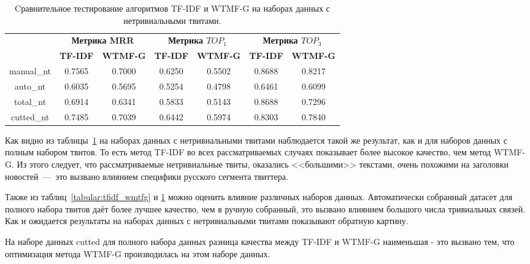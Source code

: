     \begin{table}[ht!]
    \caption{Cравнительное тестирование алгоритмов TF-IDF и WTMF-G на наборах данных с нетривиальными твитами. \bigskip}
    \centering

    \label{tabular:tfidf_wmtfg_nt}
        \begin{tabular}{|c|c|c|c|c|c|c|}
            \hline
            \bf{\multirow{2}{*}{\specialcell{Набор данных}}} &
            \multicolumn{2}{|c|}{\bf{Метрика MRR}} &
            \multicolumn{2}{|c|}{\bf{Метрика $TOP_1$}} &
            \multicolumn{2}{|c|}{\bf{Метрика $TOP_3$}} \\ \cline{2-7}
            & \bf{TF-IDF} & \bf{WTMF-G} & \bf{TF-IDF} & \bf{WTMF-G} & \bf{TF-IDF} & \bf{WTMF-G} \\ \hline
            manual\_nt & 0.7565 & 0.7000 & 0.6250 & 0.5502 & 0.8688 & 0.8217 \\ \hline
            auto\_nt   & 0.6035 & 0.5695 & 0.5254 & 0.4798 & 0.6461 & 0.6099 \\ \hline
            total\_nt  & 0.6914 & 0.6341 & 0.5833 & 0.5143 & 0.8688 & 0.7296 \\ \hline
            cutted\_nt & 0.7485 & 0.7039 & 0.6442 & 0.5974 & 0.8303 & 0.7840 \\ \hline
        \end{tabular}
    \end{table}

    Как видно из таблицы~\ref{tabular:tfidf_wmtfg_nt} на наборах данных с нетривиальными твитами наблюдается такой же результат, как и для наборов данных с полным набором твитов.
    То есть метод TF-IDF во всех рассматриваемых случаях показывает более высокое качество, чем метод WTMF-G.
    Из этого следует, что рассматриваемые нетривиальные твиты, оказались <<большими>> текстами, очень похожими на заголовки новостей~---~это вызвано влиянием специфики русского сегмента
    твиттера.

    Также из таблиц~\ref{tabular:tfidf_wmtfg} и \ref{tabular:tfidf_wmtfg_nt} можно оценить влияние различных наборов данных.
    Автоматически собранный датасет для полного набора твитов даёт более лучшее качество, чем в ручную собранный, это вызвано влиянием большого числа тривиальных связей. Как и ожидается
    результаты на наборах данных с нетривиальными твитами показывают обратную картину.

    На наборе данных cutted для полного набора данных разница качества между TF-IDF и WTMF-G наименьшая - это вызвано тем, что оптимизация метода WTMF-G производилась на этом наборе данных.


